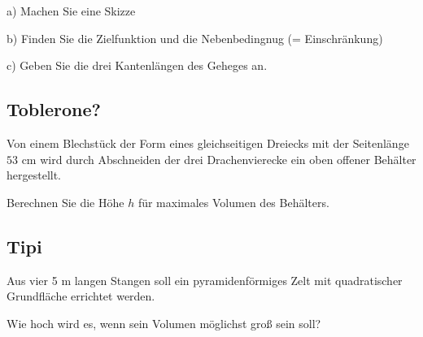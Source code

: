 a) Machen Sie eine Skizze

b) Finden Sie die Zielfunktion und die Nebenbedingnug (=
Einschränkung)

c) Geben Sie die drei Kantenlängen des Geheges an.



\subsection{Toblerone?}

Von einem Blechstück der Form eines gleichseitigen Dreiecks mit der
Seitenlänge $53 \text{ cm}$
wird durch Abschneiden der drei Drachenvierecke ein oben offener Behälter hergestellt.

Berechnen Sie die Höhe $h$ für maximales Volumen des Behälters.





\subsection{Tipi}

Aus vier 5 m langen Stangen soll ein
pyramidenförmiges Zelt mit quadratischer Grundfläche errichtet werden.

Wie hoch wird es, wenn sein Volumen möglichst groß sein soll?



